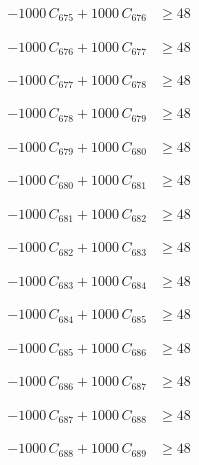 \documentclass[a4paper,11pt]{article}
\begin{document}
\begin{align}
-1000\,C_{675} + 1000\,C_{676} &\geq 48 \nonumber
\end{align}

\begin{align}
-1000\,C_{676} + 1000\,C_{677} &\geq 48 \nonumber
\end{align}

\begin{align}
-1000\,C_{677} + 1000\,C_{678} &\geq 48 \nonumber
\end{align}

\begin{align}
-1000\,C_{678} + 1000\,C_{679} &\geq 48 \nonumber
\end{align}

\begin{align}
-1000\,C_{679} + 1000\,C_{680} &\geq 48 \nonumber
\end{align}

\begin{align}
-1000\,C_{680} + 1000\,C_{681} &\geq 48 \nonumber
\end{align}

\begin{align}
-1000\,C_{681} + 1000\,C_{682} &\geq 48 \nonumber
\end{align}

\begin{align}
-1000\,C_{682} + 1000\,C_{683} &\geq 48 \nonumber
\end{align}

\begin{align}
-1000\,C_{683} + 1000\,C_{684} &\geq 48 \nonumber
\end{align}

\begin{align}
-1000\,C_{684} + 1000\,C_{685} &\geq 48 \nonumber
\end{align}

\begin{align}
-1000\,C_{685} + 1000\,C_{686} &\geq 48 \nonumber
\end{align}

\begin{align}
-1000\,C_{686} + 1000\,C_{687} &\geq 48 \nonumber
\end{align}

\begin{align}
-1000\,C_{687} + 1000\,C_{688} &\geq 48 \nonumber
\end{align}

\begin{align}
-1000\,C_{688} + 1000\,C_{689} &\geq 48 \nonumber
\end{align}
\end{document}
